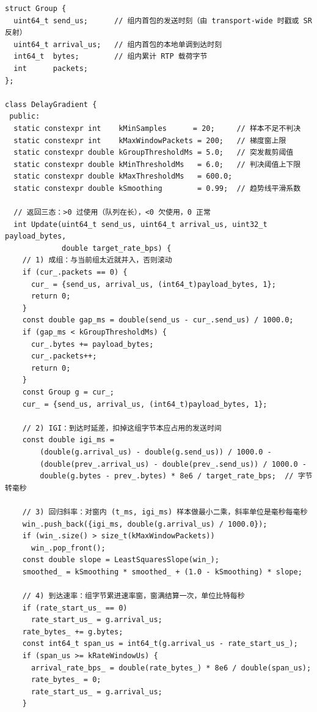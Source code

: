 \documentclass[12pt,a4paper,fontset=fandol]{ctexbook}
\begin{document}
\begin{lstlisting}[style=cppstyle,caption={接收侧延迟梯度与到达速率估计的最小骨架},label={lst:ch14-trendline}]
struct Group {
  uint64_t send_us;      // 组内首包的发送时刻（由 transport-wide 时戳或 SR 反射）
  uint64_t arrival_us;   // 组内首包的本地单调到达时刻
  int64_t  bytes;        // 组内累计 RTP 载荷字节
  int      packets;
};

class DelayGradient {
 public:
  static constexpr int    kMinSamples      = 20;     // 样本不足不判决
  static constexpr int    kMaxWindowPackets = 200;   // 梯度窗上限
  static constexpr double kGroupThresholdMs = 5.0;   // 突发裁剪阈值
  static constexpr double kMinThresholdMs   = 6.0;   // 判决阈值上下限
  static constexpr double kMaxThresholdMs   = 600.0;
  static constexpr double kSmoothing        = 0.99;  // 趋势线平滑系数

  // 返回三态：>0 过使用（队列在长），<0 欠使用，0 正常
  int Update(uint64_t send_us, uint64_t arrival_us, uint32_t payload_bytes,
             double target_rate_bps) {
    // 1) 成组：与当前组太近就并入，否则滚动
    if (cur_.packets == 0) {
      cur_ = {send_us, arrival_us, (int64_t)payload_bytes, 1};
      return 0;
    }
    const double gap_ms = double(send_us - cur_.send_us) / 1000.0;
    if (gap_ms < kGroupThresholdMs) {
      cur_.bytes += payload_bytes;
      cur_.packets++;
      return 0;
    }
    const Group g = cur_;
    cur_ = {send_us, arrival_us, (int64_t)payload_bytes, 1};

    // 2) IGI：到达时延差，扣掉这组字节本应占用的发送时间
    const double igi_ms =
        (double(g.arrival_us) - double(g.send_us)) / 1000.0 -
        (double(prev_.arrival_us) - double(prev_.send_us)) / 1000.0 -
        double(g.bytes - prev_.bytes) * 8e6 / target_rate_bps;  // 字节转毫秒

    // 3) 回归斜率：对窗内 (t_ms, igi_ms) 样本做最小二乘，斜率单位是毫秒每毫秒
    win_.push_back({igi_ms, double(g.arrival_us) / 1000.0});
    if (win_.size() > size_t(kMaxWindowPackets))
      win_.pop_front();
    const double slope = LeastSquaresSlope(win_);
    smoothed_ = kSmoothing * smoothed_ + (1.0 - kSmoothing) * slope;

    // 4) 到达速率：组字节累进速率窗，窗满结算一次，单位比特每秒
    if (rate_start_us_ == 0)
      rate_start_us_ = g.arrival_us;
    rate_bytes_ += g.bytes;
    const int64_t span_us = int64_t(g.arrival_us - rate_start_us_);
    if (span_us >= kRateWindowUs) {
      arrival_rate_bps_ = double(rate_bytes_) * 8e6 / double(span_us);
      rate_bytes_ = 0;
      rate_start_us_ = g.arrival_us;
    }


\end{lstlisting}
\end{document}
